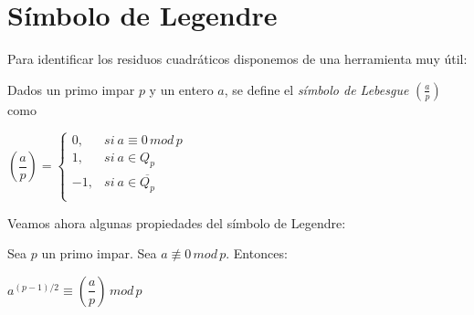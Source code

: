 




\section{Símbolo de Legendre}

Para identificar los residuos cuadráticos disponemos de una herramienta muy útil:

\begin{definition}
	Dados un primo impar $p$ y un entero $a$, se define el \textit{símbolo de Lebesgue} $\left( \frac{a}{p} \right) $ como
	
	\begin{center}
		$
		\left( \dfrac{a}{p} \right) = 
		\begin{cases}
			0, & si\ a \equiv 0 \, mod \, p\\
			1, & si\ a \in Q_p  \\
			-1, & si\ a \in \overline{Q_p} \\
		\end{cases}
		$
	\end{center}
\end{definition}

\hfil

Veamos ahora algunas propiedades del símbolo de Legendre:

\begin{theorem}
	Sea $p$ un primo impar. Sea $a \not\equiv 0 \, mod \, p$. Entonces:
	
 	\begin{center}
 		$ a^{(p-1)/2} \equiv \left( \dfrac{a}{p} \right)  \, mod \, p$
 	\end{center}
	
\end{theorem}

